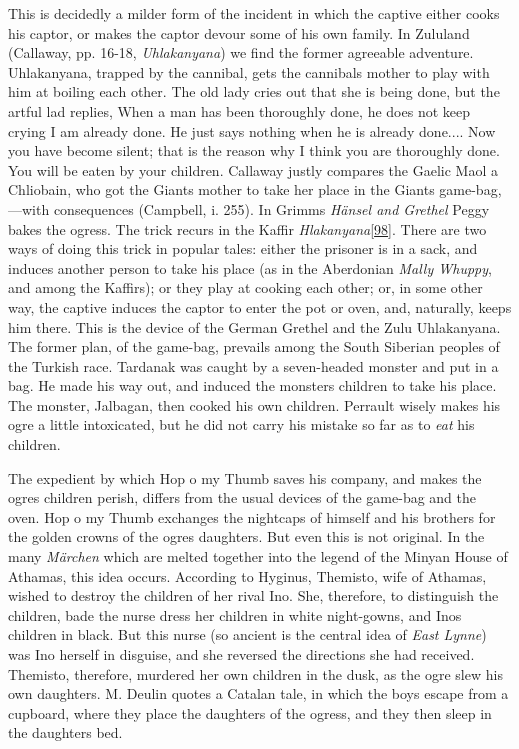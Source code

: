 \documentclass[14pt,a4paper]{memoir}
\begin{document}
This is decidedly a milder form of the incident in which the captive
either cooks his captor, or makes the captor devour some of his own
family. In Zululand (Callaway, pp. 16-18, \emph{Uhlakanyana}) we find
the former agreeable adventure. Uhlakanyana, trapped by the cannibal,
gets the cannibal\textquotesingle s mother to play with him at boiling
each other. The old lady cries out that she is \textquotesingle being
done,\textquotesingle{} but the artful lad replies,
\textquotesingle When a man has been thoroughly done, he does not keep
crying I am already done. He just says nothing when he is already
done.... Now you have become silent; that is the reason why I think you
are thoroughly done. You will be eaten by your
children.\textquotesingle{} Callaway justly compares the Gaelic Maol a
Chliobain, who got the Giant\textquotesingle s mother to take her place
in the Giant\textquotesingle s game-bag,---with consequences (Campbell,
i. 255). In Grimm\textquotesingle s \emph{Hänsel and Grethel} Peggy
bakes the ogress. The trick recurs in the Kaffir
\emph{Hlakanyana}\protect\hypertarget{4533318093929944247_33931-h-1.htm.xhtmlux5cux23FNanchor_98}{}{}\protect\hyperlink{4533318093929944247_33931-h-1.htm.xhtmlux5cux23Footnote_98}{{[}98{]}}.
There are two ways of doing this trick in popular tales: either the
prisoner is in a sack, and induces another person to take his place (as
in the Aberdonian \emph{Mally Whuppy}, and among the Kaffirs); or they
play at cooking each other; or, in some other way, the captive induces
the captor to enter the pot or oven, and, naturally, keeps him there.
This is the device of the German Grethel and the Zulu Uhlakanyana. The
former plan, of the game-bag, prevails among the South Siberian peoples
of the Turkish race. Tardanak was caught by a seven-headed monster and
put in a bag. He made his way out, and induced the
monster\textquotesingle s children to take his place. The monster,
Jalbagan, then cooked his own children. Perrault wisely makes his ogre a
little intoxicated, but he did not carry his mistake so far as to
\emph{eat} his children.

The expedient by which Hop o\textquotesingle{} my Thumb saves his
company, and makes the ogre\textquotesingle s children perish, differs
from the usual devices of the game-bag and the oven. Hop
o\textquotesingle{} my Thumb exchanges the nightcaps of himself and his
brothers for the golden crowns of the ogre\textquotesingle s daughters.
But even this is not original. In the many \emph{Märchen} which are
melted together into the legend of the Minyan House of Athamas, this
idea occurs. According to Hyginus, Themisto, wife of Athamas, wished to
destroy the children of her rival Ino. She, therefore, to distinguish
the children, bade the nurse dress her children in white night-gowns,
and Ino\textquotesingle s children in black. But this nurse (so ancient
is the central idea of \emph{East Lynne}) was Ino herself in disguise,
and she reversed the directions she had received. Themisto, therefore,
murdered her own children in the dusk, as the ogre slew his own
daughters. M. Deulin quotes a Catalan tale, in which the boys escape
from a cupboard, where they place the daughters of the ogress, and they
then sleep in the daughters\textquotesingle{} bed.
\end{document}
